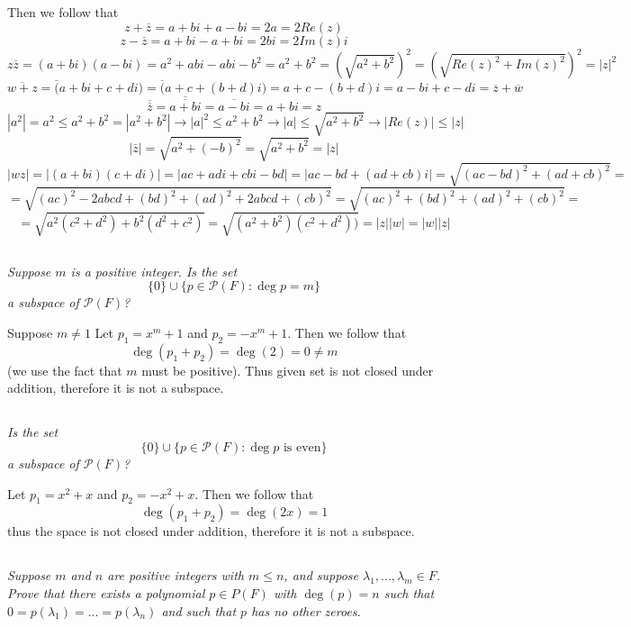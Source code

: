 \documentclass[11pt,oneside,titlepage]{book}
\begin{document}
Then we follow that 
$$z + \overline{z} = a + bi + a - bi = 2a = 2 Re(z)$$
$$z - \overline{z} = a + bi - a + bi = 2bi = 2 Im(z) i$$
$$z \overline{z} = (a + bi) (a - bi) = a^2 + abi - abi - b^2 = a^2 + b^2 =
(\sqrt{a^2 + b^2})^2 = (\sqrt{Re(z)^2 + Im(z)^2})^2 = |z|^2$$
$$\overline{w + z} = \overline(a + bi + c + di) =
\overline(a + c + (b + d)i) = a + c - (b + d)i = a - bi + c - di = \overline{z} + \overline{w}$$
$$\overline{\overline{z}} = \overline{\overline{a + bi}}  =
\overline{a - bi} = a + bi = z$$
$$|a^2|  = a^2 \leq a^2 + b^2 = |a^2 + b^2| \to |a|^2 \leq a^2 + b^2 \to |a| \leq \sqrt{a^2 + b^2}
\to  |Re(z)| \leq |z| $$
$$|\overline{z}| = \sqrt{a^2 + (-b)^2} = \sqrt{a^2 + b^2} = |z|$$
$$|wz| = |(a + bi) (c + di)| = |ac + adi + cbi - bd| = |ac - bd +  (ad + cb)i| =
\sqrt{(ac - bd)^2 + (ad + cb)^2} = $$
$$ = \sqrt{(ac)^2 - 2abcd + (bd)^2 + (ad)^2 + 2abcd  + (cb)^2} =
\sqrt{(ac)^2  + (bd)^2 + (ad)^2  + (cb)^2} = $$
$$ = \sqrt{a^2(c^2 + d^2)  + b^2(d^2 + c^2)}  = \sqrt{(a^2 + b^2)(c^2 + d^2))}  = |z||w| = |w||z|$$

\subsection{}

\textit{Suppose $m$ is a positive integer. Is the set}
$$ \{0\} \cup \{p \in \mathcal{P}(F): \deg p = m\}$$
\textit{a subspace of $\mathcal{P}(F)$?}

Suppose $m \neq 1$
Let $p_1 = x^m + 1$ and $p_2 = -x^m + 1$. Then we follow that
$$\deg(p_1 + p_2) = \deg(2) = 0 \neq m $$
(we use the fact that $m$ must be positive). Thus given set is not closed under addition,
therefore it is not a subspace.

\subsection{}

\textit{Is the set}
$$\{0\} \cup \{p \in \mathcal{P}(F): \deg p \text{ is even}\}$$
\textit{a subspace of $\mathcal P (F)$?}

Let $p_1 = x^2 + x$ and $p_2 = -x^2 + x$. Then we follow that
$$\deg(p_1 + p_2) = \deg(2x) = 1$$
thus the space is not closed under addition, therefore it is not a subspace.

\subsection{}

\textit{Suppose $m$ and $n$ are positive integers with $m \leq n$, and suppose
  $\lambda_1, ..., \lambda_m \in F$. Prove that there exists a polynomial $p \in P(F)$
  with $\deg(p) = n$ such that $0 = p(\lambda_1) = ... = p(\lambda_n)$ and such that
  $p$ has no other zeroes.}
\end{document}
